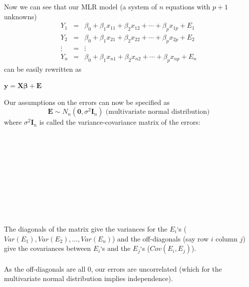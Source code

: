 Now we can see that our MLR model (a system of $n$ equations with $p+1$ unknowns) 
\begin{eqnarray*}
Y_1 & = & \beta_0 + \beta_1 x_{11} + \beta_2 x_{12}+ \cdots + \beta_p x_{1p} + E_1 \\
Y_2 & = & \beta_0 + \beta_1 x_{21} + \beta_2 x_{22}+ \cdots + \beta_p x_{2p} + E_2 \\
\vdots & = & \vdots \\
Y_n & = & \beta_0 + \beta_1 x_{n1} + \beta_2 x_{n2}+ \cdots + \beta_p x_{np} + E_n
\end{eqnarray*}
can be easily rewritten as
\begin{center}
$\textbf{y} = \textbf{X}\boldsymbol{\beta} + \textbf{E}$
\end{center}

\newpage

Our assumptions on the errors can now be specified as 
$$\textbf{E}\sim N_n(\boldsymbol{0},\sigma^2 \textbf{I}_{n}) \mbox{   (multivariate normal distribution)}$$
where $\sigma^2 \textbf{I}_{n}$ is called the variance-covariance matrix of the errors:\\~\\~\\~\\~\\~\\~\\~\\~\\~\\~\\


The diagonals of the matrix give the variances for the $E_i$`s ($Var(E_1), Var(E_2), \ldots, Var(E_n)$) and the off-diagonals (say row $i$ column $j$) give the covariances between $E_i$`s and the $E_j$`s ($Cov(E_i, E_j)$).  \\~\\
As the off-diagonals are all 0, our errors are uncorrelated (which for the multivariate normal distribution implies independence).\\~\\

